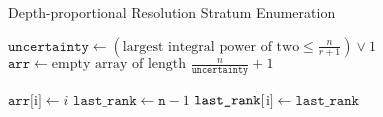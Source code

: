 \begin{algorithm}
\caption{Depth-proportional Resolution Stratum Enumeration}
\label{alg:depth-proportional-resolution-algo-enum-retained-ranks}
\begin{algorithmic}[1]

    \State $\texttt{uncertainty} \gets (\text{largest integral power of two} \le \frac{n}{r + 1}) \lor 1$
    \State $\texttt{arr} \gets \text{empty array of length } \frac{n}{\texttt{uncertainty}} + 1$

        \State $\texttt{arr} [$i$] \gets i$
    \EndFor
    \State $\texttt{last\_rank} \gets \texttt{n} - 1$
        \State $\texttt{\texttt{last\_rank}} [$i$] \gets \texttt{last\_rank}$
    \EndIf
\end{algorithmic}
\end{algorithm}
